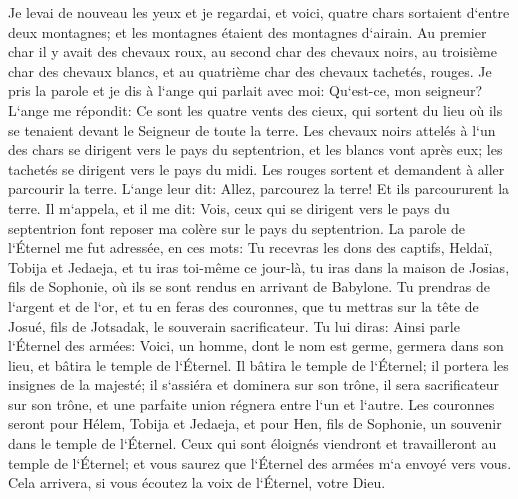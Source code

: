 \verse Je levai de nouveau les yeux et je regardai, et voici, quatre chars sortaient d`entre deux montagnes; et les montagnes étaient des montagnes d`airain. 
\verse Au premier char il y avait des chevaux roux, au second char des chevaux noirs, 
\verse au troisième char des chevaux blancs, et au quatrième char des chevaux tachetés, rouges. 
\verse Je pris la parole et je dis à l`ange qui parlait avec moi: Qu`est-ce, mon seigneur? 
\verse L`ange me répondit: Ce sont les quatre vents des cieux, qui sortent du lieu où ils se tenaient devant le Seigneur de toute la terre. 
\verse Les chevaux noirs attelés à l`un des chars se dirigent vers le pays du septentrion, et les blancs vont après eux; les tachetés se dirigent vers le pays du midi. 
\verse Les rouges sortent et demandent à aller parcourir la terre. L`ange leur dit: Allez, parcourez la terre! Et ils parcoururent la terre. 
\verse Il m`appela, et il me dit: Vois, ceux qui se dirigent vers le pays du septentrion font reposer ma colère sur le pays du septentrion. 
\verse La parole de l`Éternel me fut adressée, en ces mots: 
\verse Tu recevras les dons des captifs, Heldaï, Tobija et Jedaeja, et tu iras toi-même ce jour-là, tu iras dans la maison de Josias, fils de Sophonie, où ils se sont rendus en arrivant de Babylone. 
\verse Tu prendras de l`argent et de l`or, et tu en feras des couronnes, que tu mettras sur la tête de Josué, fils de Jotsadak, le souverain sacrificateur. 
\verse Tu lui diras: Ainsi parle l`Éternel des armées: Voici, un homme, dont le nom est germe, germera dans son lieu, et bâtira le temple de l`Éternel. 
\verse Il bâtira le temple de l`Éternel; il portera les insignes de la majesté; il s`assiéra et dominera sur son trône, il sera sacrificateur sur son trône, et une parfaite union régnera entre l`un et l`autre. 
\verse Les couronnes seront pour Hélem, Tobija et Jedaeja, et pour Hen, fils de Sophonie, un souvenir dans le temple de l`Éternel. 
\verse Ceux qui sont éloignés viendront et travailleront au temple de l`Éternel; et vous saurez que l`Éternel des armées m`a envoyé vers vous. Cela arrivera, si vous écoutez la voix de l`Éternel, votre Dieu. 

\chapter{}

